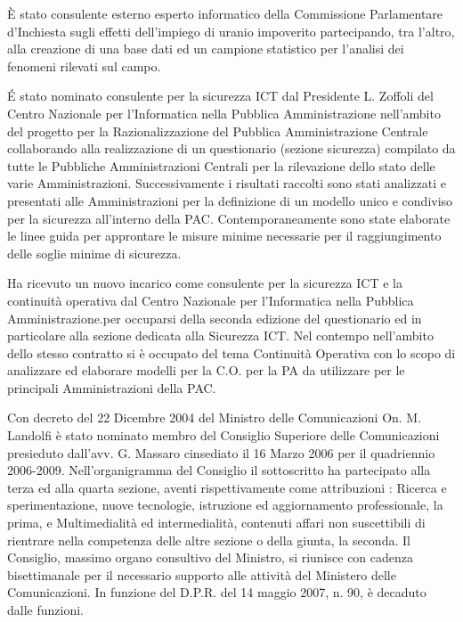 \documentclass[11pt,a4paper,sans]{moderncv}        %
\begin{document}
{
\`E stato consulente esterno esperto informatico della Commissione Parlamentare d’Inchiesta sugli effetti dell’impiego di uranio impoverito partecipando, tra l'altro, alla creazione di una base dati ed un campione statistico per l’analisi dei fenomeni rilevati sul campo.
}

{
\'E stato nominato consulente per la sicurezza ICT dal Presidente L. Zoffoli del Centro Nazionale per l’Informatica nella Pubblica Amministrazione nell’ambito del progetto per la Razionalizzazione del Pubblica Amministrazione Centrale collaborando alla realizzazione di un questionario (sezione sicurezza) compilato da tutte le Pubbliche Amministrazioni Centrali per la rilevazione dello stato delle varie Amministrazioni. Successivamente i risultati raccolti sono stati analizzati e presentati alle Amministrazioni per la definizione di un modello unico e condiviso per la sicurezza all’interno della PAC. Contemporaneamente sono state elaborate le linee guida per approntare le misure minime necessarie per il raggiungimento delle soglie minime di sicurezza.
}

{
Ha ricevuto un nuovo incarico come consulente per la sicurezza ICT e la continuità operativa dal Centro Nazionale per l’Informatica nella Pubblica Amministrazione.per occuparsi della seconda edizione del questionario ed in particolare alla sezione dedicata alla Sicurezza ICT.
Nel contempo nell’ambito dello stesso contratto si è occupato del tema Continuità Operativa con lo scopo di analizzare ed elaborare modelli per la C.O. per la PA da utilizzare per le principali Amministrazioni della PAC.
}

{
Con decreto del 22 Dicembre 2004 del Ministro delle Comunicazioni On. M. Landolfi è stato nominato membro del Consiglio Superiore delle Comunicazioni presieduto dall’avv. G. Massaro cinsediato il 16 Marzo 2006 per il quadriennio 2006-2009. Nell’organigramma del Consiglio il sottoscritto ha partecipato alla terza ed alla quarta sezione, aventi rispettivamente come attribuzioni :
Ricerca e sperimentazione, nuove tecnologie, istruzione ed aggiornamento professionale, la prima, e Multimedialità ed intermedialità, contenuti affari non suscettibili di rientrare nella competenza delle altre sezione o della giunta, la seconda. Il Consiglio, massimo organo consultivo del Ministro, si riunisce con cadenza bisettimanale per il necessario supporto alle attività del Ministero delle Comunicazioni. In funzione del D.P.R. del 14 maggio 2007, n. 90, è decaduto dalle funzioni.
}
\end{document}
